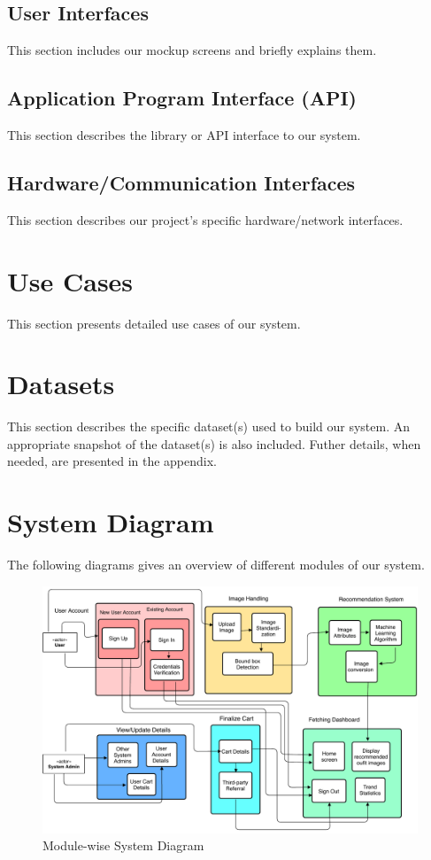 \subsection{User Interfaces}
This section includes our mockup screens and briefly explains them.

\subsection{Application Program Interface (API)}
This section describes the library or API interface to our system.

\subsection{Hardware/Communication Interfaces}
This section describes our project's specific hardware/network interfaces.

\section{Use Cases}
This section presents detailed use cases of our system.

\section{Datasets}
This section describes the specific dataset(s) used to build our system. An appropriate snapshot of the dataset(s) is also included. Futher details, when needed, are presented in the appendix.

\section{System Diagram}
The following diagrams gives an overview of different modules of our system.

\begin{figure}[ht]
\includegraphics[width=15cm]{images/systemDiagram.pdf} 
\centering
\caption{Module-wise System Diagram}
\end{figure}

